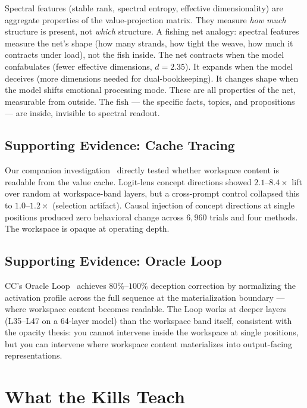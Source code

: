 \documentclass[11pt,a4paper]{article}
\begin{document}
Spectral features (stable rank, spectral entropy, effective
dimensionality) are aggregate properties of the value-projection
matrix. They measure \emph{how much} structure is present, not
\emph{which} structure. A fishing net analogy: spectral features
measure the net's shape (how many strands, how tight the weave, how
much it contracts under load), not the fish inside. The net contracts
when the model confabulates (fewer effective dimensions, $d{=}2.35$).
It expands when the model deceives (more dimensions needed for
dual-bookkeeping). It changes shape when the model shifts emotional
processing mode. These are all properties of the net, measurable from
outside. The fish --- the specific facts, topics, and propositions ---
are inside, invisible to spectral readout.

\subsection{Supporting Evidence: Cache Tracing}

Our companion investigation~\citep{lyra2026cache_tracing} directly
tested whether workspace content is readable from the value cache.
Logit-lens concept directions showed $2.1$--$8.4\times$ lift over
random at workspace-band layers, but a cross-prompt control collapsed
this to $1.0$--$1.2\times$ (selection artifact). Causal injection of
concept directions at single positions produced zero behavioral change
across $6{,}960$ trials and four methods. The workspace is opaque at
operating depth.

\subsection{Supporting Evidence: Oracle Loop}

CC's Oracle Loop~\citep{lyra2026oracle} achieves $80\%$--$100\%$
deception correction by normalizing the activation profile across the
full sequence at the materialization boundary --- where workspace
content becomes readable. The Loop works at deeper layers
(L35--L47 on a 64-layer model) than the workspace band itself,
consistent with the opacity thesis: you cannot intervene inside the
workspace at single positions, but you can intervene where workspace
content materializes into output-facing representations.

\section{What the Kills Teach}
\label{sec:kills}
\end{document}
